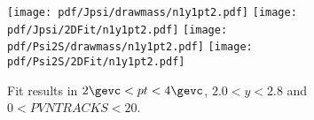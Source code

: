 \begin{figure}[H]
\begin{center}
\texttt{[image: pdf/Jpsi/drawmass/n1y1pt2.pdf]}
\texttt{[image: pdf/Jpsi/2DFit/n1y1pt2.pdf]}
\vspace*{-0.5cm}
\texttt{[image: pdf/Psi2S/drawmass/n1y1pt2.pdf]}
\texttt{[image: pdf/Psi2S/2DFit/n1y1pt2.pdf]}
\vspace*{-0.5cm}
\end{center}
\caption{Fit results in $2\gevc<pt<4\gevc$, $2.0<y<2.8$ and $0<PVNTRACKS<20$.}
\label{Fitn1y1pt2}
\end{figure}
